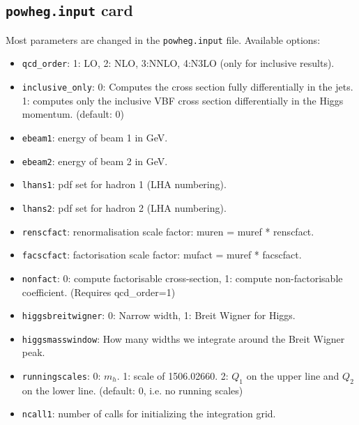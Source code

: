 \documentclass[12pt,a4]{article}
\begin{document}
\subsection{\texttt{powheg.input} card}
Most parameters are changed in the \texttt{powheg.input} file.
%
Available options:
\begin{itemize}
\item \texttt{qcd\_order}: 1: LO, 2: NLO, 3:NNLO, 4:N3LO (only for
  inclusive results).

\item \texttt{inclusive\_only}: 0: Computes the cross section fully
  differentially in the jets. 1: computes only the inclusive VBF cross
  section differentially in the Higgs momentum. (default: 0)

\item\texttt{ebeam1}: energy of beam 1 in GeV.
  
\item\texttt{ebeam2}: energy of beam 2 in GeV.

\item\texttt{lhans1}: pdf set for hadron 1 (LHA numbering).

\item\texttt{lhans2}: pdf set for hadron 2 (LHA numbering).

\item\texttt{renscfact}: renormalisation scale factor: muren = muref *
  renscfact.
  
\item\texttt{facscfact}: factorisation scale factor: mufact = muref *
  facscfact.
  
\item\texttt{nonfact}: 0: compute factorisable cross-section, 1: compute
  non-factorisable coefficient. (Requires qcd\_order=1)
  
\item\texttt{higgsbreitwigner}: 0: Narrow width, 1: Breit Wigner for Higgs.
  
\item\texttt{higgsmasswindow}: How many widths we integrate around the
  Breit Wigner peak.
  
\item\texttt{runningscales}: 0: $m_h$. 1: scale of 1506.02660. 2: $Q_1$
  on the upper line and $Q_2$ on the lower line. (default: 0, i.e. no
  running scales)
                  
\item\texttt{ncall1}: number of calls for initializing the integration grid.
  

\end{itemize}
\end{document}

